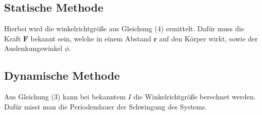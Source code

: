 \subsection{Statische Methode}
Hierbei wird die winkelrichtgröße aus Gleichung (4) ermittelt. Dafür muss die
Kraft $\symbf{F}$ bekannt sein, welche in einem Abstand $\symbf{r}$ auf den Körper wirkt,
sowie der Auslenkungswinkel $\phi$.
\subsection{Dynamische Methode}
Aus Gleichung (3) kann bei bekanntem $I$ die Winkelrichtgröße berechnet werden. Dafür
misst man die Periodendauer der Schwingung des Systems.
